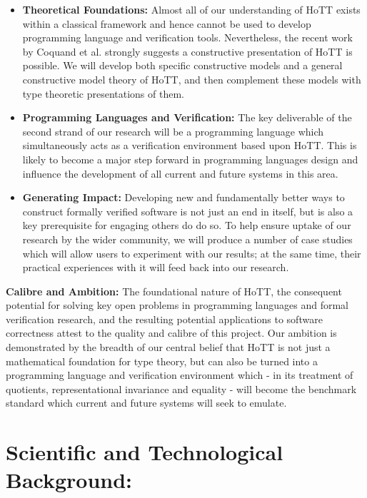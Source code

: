 \documentclass[a4paper,11pt]{article}
\begin{document}
\begin{itemize}
\item {\bf Theoretical Foundations:} Almost all of our understanding
  of HoTT exists within a classical framework and hence cannot be used
  to develop programming language and verification tools. Nevertheless, the recent
  work by Coquand et al. strongly suggests a constructive presentation of HoTT
  is possible. We will develop both specific constructive models
  and a general constructive model theory of HoTT, and then complement
  these models with type theoretic presentations of them.
\item {\bf Programming Languages and Verification:} The key
  deliverable of the second strand of our research will be a
  programming language which simultaneously acts as a verification
  environment based upon HoTT. This is likely to become a major
  step forward in programming languages design and influence
  the development of all current and future systems in this area.
\item {\bf Generating Impact:} Developing new and fundamentally
  better ways to construct formally verified software is not just an
  end in itself, but is also a key prerequisite for engaging others do
  do so.  To help ensure uptake of our research by the wider
  community, we will produce a number of case studies which will allow
  users to experiment with our results; at the same time, their
  practical experiences with it will feed back into our research.
\end{itemize}

{\bf Calibre and Ambition:} The foundational nature of HoTT, the
consequent potential for solving key open problems in programming
languages and formal verification research, and the resulting
potential applications to software correctness attest to the quality
and calibre of this project. Our ambition is demonstrated by the
breadth of our central belief that HoTT is not just a mathematical
foundation for type theory, but can also be turned into a programming
language and verification environment which - in its treatment of
quotients, representational invariance and equality - will become the
benchmark standard which current and future systems will seek to
emulate.


\section{Scientific and Technological Background:}
\end{document}
